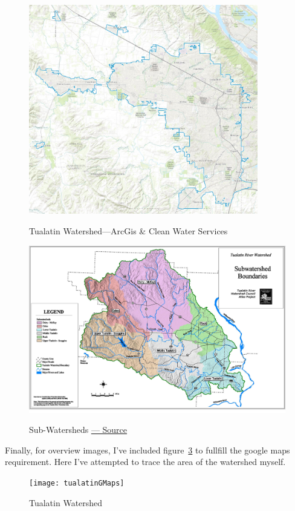 \documentclass{article}
\begin{document}
\begin{figure}[H]
\centering{}
\caption{Tualatin Watershed---ArcGis \& Clean Water Services}
\includegraphics[width=10cm]{tualatinGeoView}
\label{tualatinborder}
\end{figure}

\begin{figure}[H]
\centering{}
\caption{Sub-Watersheds \href{http://trwc.org/wp-content/uploads/2013/03/Subbasins-entire.jpg}{\underline{--- Source}}}
\includegraphics[width=12cm]{tualatinSubWatersheds}
\label{tualatinsubsheds}
\end{figure}

Finally, for overview images, I've included figure~\ref{gMaps} to fullfill the google maps requirement. Here I've attempted
to trace the area of the watershed myself.

\begin{figure}[H]
\centering{}
\caption{Tualatin Watershed}
\texttt{[image: tualatinGMaps]}
\label{gMaps}
\end{figure}
\end{document}
